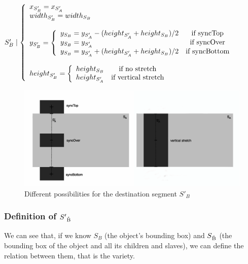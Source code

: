 \documentclass[a4paper]{article}
\begin{document}
$S'_B \mid \left\lbrace 
\begin{array}{lcl} 
x_{S'_B} = x_{S'_A}\\
\bigskip
width_{S'_B} = width_{S_B}\\
\bigskip
y _{S'_B} = \left\lbrace
\begin{array}{lcl}
y_{S_B} = y_{S'_A} - (height_{S'_A} + height_{S_B})/2 & \text{if syncTop}\\ 
y_{S_B} = y_{S'_A} & \text{if syncOver}\\
y_{S_B} = y_{S'_A} + (height_{S'_A} + height_{S_B})/2 & \text{if syncBottom}
\end{array}\right.\\
height _{S'_B} = \left\lbrace
\begin{array}{lcl}
height_{S_B} & \text{if no stretch}\\
height_{S'_A} & \text{if vertical stretch}
\end{array}\right.\\
\end{array}\right.$

\begin{figure}[h]
\begin{center}
\includegraphics[width=13cm]{img/top_over_bottomF.png}
\caption{Different possibilities for the destination segment $S'_B$}
\label{fig:possibleDestRect}
\end{center}
\end{figure}




\subsubsection{Definition of $S'\textsubscript{\r{B}}$}\label{subsubsec:defDestChildRect}

We can see that, if we know $S_B$ (the object's bounding box) and $S\textsubscript{\r{B}}$ (the bounding box of the object and all its children and slaves), we can define the relation between them, that is the variety. 
\end{document}

